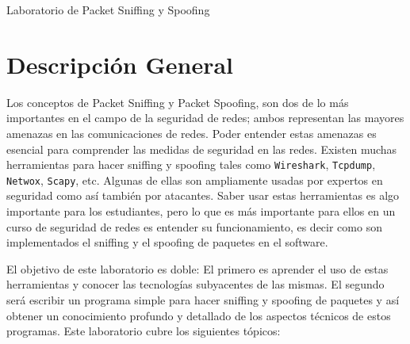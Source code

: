 
\newcommand{\commonfolder}{../../common-files}




\newcommand{\pcap} {\texttt{pcap}\xspace}
\newcommand{\telnet} {\texttt{telnet}\xspace}







\begin{center}
{\LARGE Laboratorio de Packet Sniffing y Spoofing}
\end{center}



\setcounter{task}{1}
\newcommand{\tasks} {\bf {\noindent (\arabic{task})} \addtocounter{task}{1} \,}

\section{Descripción General}

Los conceptos de Packet Sniffing y Packet Spoofing, son dos de lo más importantes en el campo de la seguridad de redes; ambos representan las mayores amenazas en las comunicaciones de redes. Poder entender estas amenazas es esencial para comprender las medidas de seguridad en las redes. Existen muchas herramientas para hacer sniffing y spoofing tales como {\tt Wireshark}, {\tt Tcpdump}, {\tt Netwox}, \texttt{Scapy}, etc.
Algunas de ellas son ampliamente usadas por expertos en seguridad como así también por atacantes. Saber usar estas herramientas es algo importante para los estudiantes, pero lo que es más importante para ellos en un curso de seguridad de redes es entender su funcionamiento, es decir como son implementados el sniffing y el spoofing de paquetes en el software.

El objetivo de este laboratorio es doble: El primero es aprender el uso de estas herramientas y conocer las tecnologías subyacentes de las mismas.
El segundo será escribir un programa simple para hacer sniffing y spoofing de paquetes y así obtener un conocimiento profundo y detallado de los aspectos técnicos de estos programas.
Este laboratorio cubre los siguientes tópicos:


